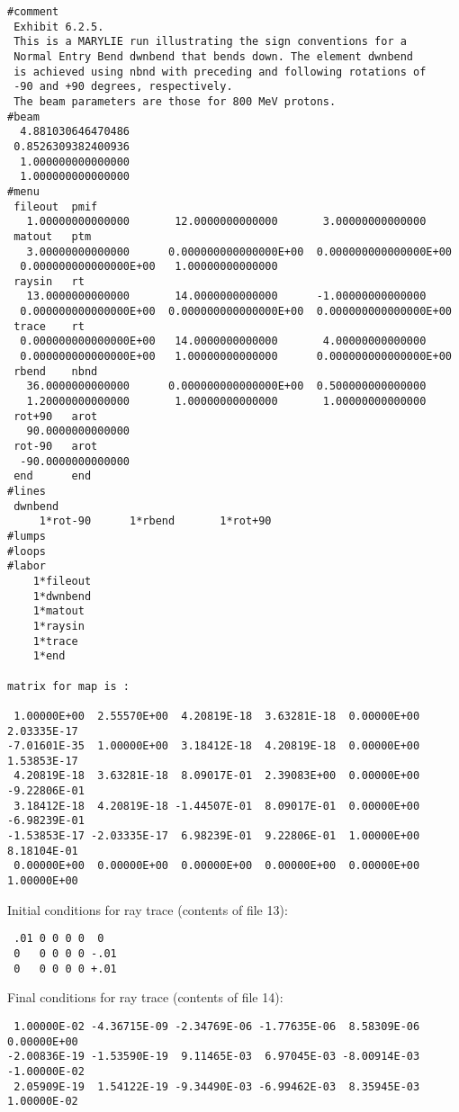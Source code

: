 \newpage
\begin{footnotesize}
\begin{verbatim}
#comment
 Exhibit 6.2.5.
 This is a MARYLIE run illustrating the sign conventions for a
 Normal Entry Bend dwnbend that bends down. The element dwnbend
 is achieved using nbnd with preceding and following rotations of
 -90 and +90 degrees, respectively.
 The beam parameters are those for 800 MeV protons.
#beam
  4.881030646470486
 0.8526309382400936
  1.000000000000000
  1.000000000000000
#menu
 fileout  pmif
   1.00000000000000       12.0000000000000       3.00000000000000
 matout   ptm
   3.00000000000000      0.000000000000000E+00  0.000000000000000E+00
  0.000000000000000E+00   1.00000000000000
 raysin   rt
   13.0000000000000       14.0000000000000      -1.00000000000000
  0.000000000000000E+00  0.000000000000000E+00  0.000000000000000E+00
 trace    rt
  0.000000000000000E+00   14.0000000000000       4.00000000000000
  0.000000000000000E+00   1.00000000000000      0.000000000000000E+00
 rbend    nbnd
   36.0000000000000      0.000000000000000E+00  0.500000000000000
   1.20000000000000       1.00000000000000       1.00000000000000
 rot+90   arot
   90.0000000000000
 rot-90   arot
  -90.0000000000000
 end      end
#lines
 dwnbend
     1*rot-90      1*rbend       1*rot+90
#lumps
#loops
#labor
    1*fileout
    1*dwnbend
    1*matout
    1*raysin
    1*trace
    1*end

matrix for map is :

 1.00000E+00  2.55570E+00  4.20819E-18  3.63281E-18  0.00000E+00  2.03335E-17
-7.01601E-35  1.00000E+00  3.18412E-18  4.20819E-18  0.00000E+00  1.53853E-17
 4.20819E-18  3.63281E-18  8.09017E-01  2.39083E+00  0.00000E+00 -9.22806E-01
 3.18412E-18  4.20819E-18 -1.44507E-01  8.09017E-01  0.00000E+00 -6.98239E-01
-1.53853E-17 -2.03335E-17  6.98239E-01  9.22806E-01  1.00000E+00  8.18104E-01
 0.00000E+00  0.00000E+00  0.00000E+00  0.00000E+00  0.00000E+00  1.00000E+00
\end{verbatim}
\end{footnotesize}
Initial conditions for ray trace (contents of file 13):
\begin{footnotesize}
\begin{verbatim}
 .01 0 0 0 0  0
 0   0 0 0 0 -.01
 0   0 0 0 0 +.01
\end{verbatim}
\end{footnotesize}
Final conditions for ray trace (contents of file 14):
\begin{footnotesize}
\begin{verbatim}
 1.00000E-02 -4.36715E-09 -2.34769E-06 -1.77635E-06  8.58309E-06  0.00000E+00
-2.00836E-19 -1.53590E-19  9.11465E-03  6.97045E-03 -8.00914E-03 -1.00000E-02
 2.05909E-19  1.54122E-19 -9.34490E-03 -6.99462E-03  8.35945E-03  1.00000E-02
\end{verbatim}
\end{footnotesize}

